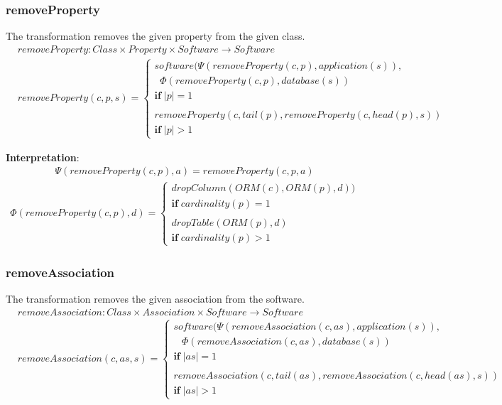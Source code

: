 \documentclass[10pt]{article}
\begin{document}
\subsubsection{removeProperty}
The transformation removes the given property from the given class.
\begin{align}
& removeProperty: Class \times Property \times Software \rightarrow Software \nonumber \\
& removeProperty(c, p, s) = \begin{cases}
    software(\Psi(removeProperty(c, p), application(s)),  \\ 
        \;\; \Phi(removeProperty(c, p), database(s)) \\
    \mathbf{if} \; |p| = 1 \\\\
    removeProperty(c, tail(p), removeProperty(c, head(p), s)) \\
        \mathbf{if} \; |p| > 1
 \end{cases}
\end{align}

\noindent \textbf{Interpretation}:
\begin{align}
\Psi(removeProperty(c, p), a) = removeProperty(c, p, a)
\end{align}
\begin{align}
\Phi(removeProperty(c, p), d) = \begin{cases}
 dropColumn(ORM(c), ORM(p), d)) \\ \mathbf{if} \; cardinality(p) = 1  \\\\ 
 dropTable(ORM(p), d) \\ \mathbf{if} \; cardinality(p) > 1 
 \end{cases}
\end{align}

\subsubsection{removeAssociation}
The transformation removes the given association from the software.
\begin{align}
& removeAssociation: Class \times Association \times Software \rightarrow Software \nonumber \\
& removeAssociation(c, as, s) = \begin{cases}
   software(\Psi( removeAssociation(c, as), application(s)), \\ 
    \;\;\; \Phi(removeAssociation(c, as), database(s)) \\
     \mathbf{if} \; |as| = 1 \\\\
   removeAssociation(c, tail(as), removeAssociation(c, head(as), s)) \\
     \mathbf{if} \; |as| > 1 
 \end{cases}
\end{align}
\end{document}
